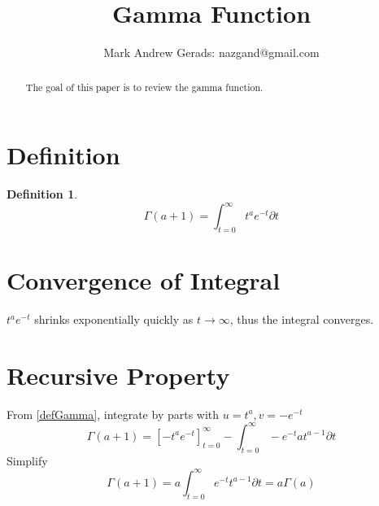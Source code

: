 \documentclass[]{article}
\author{Mark Andrew Gerads: nazgand@gmail.com}
\title{Gamma Function}
\newcommand{\pqty}[1]{{\left(#1\right)}}
\newcommand{\bqty}[1]{{\left[#1\right]}}
\newtheorem{definition}[theorem]{Definition}
\numberwithin{equation}{section}
\begin{document}
	
	\maketitle
	
	\begin{abstract}
		The goal of this paper is to review the gamma function.
	\end{abstract}
	
	\section{Definition}
	\begin{definition}
		\begin{equation}
		\label{defGamma}
		\Gamma\pqty{a+1}=\int_{t=0}^\infty t^a e^{-t} \partial t
		\end{equation}
	\end{definition}
	
	\section{Convergence of Integral}
	\(t^a e^{-t}\) shrinks exponentially quickly as \(t\to\infty\), thus the integral converges.
	
	\section{Recursive Property}
	From \eqref{defGamma}, integrate by parts with \(u=t^a, v=-e^{-t}\)
	\begin{equation}
	\Gamma\pqty{a+1}=\bqty{-t^ae^{-t}}_{t=0}^\infty - 
	\int_{t=0}^\infty -e^{-t}at^{a-1} \partial t
	\end{equation}
	Simplify
	\begin{equation}
	\Gamma\pqty{a+1}= 
	a\int_{t=0}^\infty e^{-t}t^{a-1} \partial t= 
	a\Gamma\pqty{a}
	\end{equation}
\end{document}
